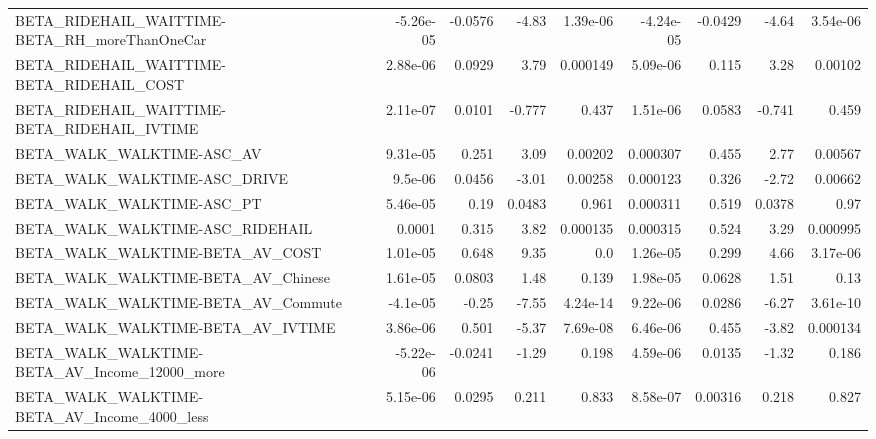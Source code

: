 \begin{tabular}{lrrrrrrrr}
BETA\_RIDEHAIL\_WAITTIME-BETA\_RH\_moreThanOneCar      &   -5.26e-05 &      -0.0576 &     -4.83 & 1.39e-06 &  -4.24e-05 &     -0.0429 &        -4.64 &      3.54e-06 \\
BETA\_RIDEHAIL\_WAITTIME-BETA\_RIDEHAIL\_COST          &    2.88e-06 &       0.0929 &      3.79 & 0.000149 &   5.09e-06 &       0.115 &         3.28 &       0.00102 \\
BETA\_RIDEHAIL\_WAITTIME-BETA\_RIDEHAIL\_IVTIME        &    2.11e-07 &       0.0101 &    -0.777 &    0.437 &   1.51e-06 &      0.0583 &       -0.741 &         0.459 \\
BETA\_WALK\_WALKTIME-ASC\_AV                          &    9.31e-05 &        0.251 &      3.09 &  0.00202 &   0.000307 &       0.455 &         2.77 &       0.00567 \\
BETA\_WALK\_WALKTIME-ASC\_DRIVE                       &     9.5e-06 &       0.0456 &     -3.01 &  0.00258 &   0.000123 &       0.326 &        -2.72 &       0.00662 \\
BETA\_WALK\_WALKTIME-ASC\_PT                          &    5.46e-05 &         0.19 &    0.0483 &    0.961 &   0.000311 &       0.519 &       0.0378 &          0.97 \\
BETA\_WALK\_WALKTIME-ASC\_RIDEHAIL                    &      0.0001 &        0.315 &      3.82 & 0.000135 &   0.000315 &       0.524 &         3.29 &      0.000995 \\
BETA\_WALK\_WALKTIME-BETA\_AV\_COST                    &    1.01e-05 &        0.648 &      9.35 &      0.0 &   1.26e-05 &       0.299 &         4.66 &      3.17e-06 \\
BETA\_WALK\_WALKTIME-BETA\_AV\_Chinese                 &    1.61e-05 &       0.0803 &      1.48 &    0.139 &   1.98e-05 &      0.0628 &         1.51 &          0.13 \\
BETA\_WALK\_WALKTIME-BETA\_AV\_Commute                 &    -4.1e-05 &        -0.25 &     -7.55 & 4.24e-14 &   9.22e-06 &      0.0286 &        -6.27 &      3.61e-10 \\
BETA\_WALK\_WALKTIME-BETA\_AV\_IVTIME                  &    3.86e-06 &        0.501 &     -5.37 & 7.69e-08 &   6.46e-06 &       0.455 &        -3.82 &      0.000134 \\
BETA\_WALK\_WALKTIME-BETA\_AV\_Income\_12000\_more       &   -5.22e-06 &      -0.0241 &     -1.29 &    0.198 &   4.59e-06 &      0.0135 &        -1.32 &         0.186 \\
BETA\_WALK\_WALKTIME-BETA\_AV\_Income\_4000\_less        &    5.15e-06 &       0.0295 &     0.211 &    0.833 &   8.58e-07 &     0.00316 &        0.218 &         0.827 \\

\end{tabular}
